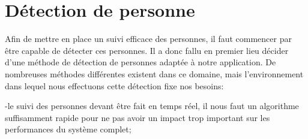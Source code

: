 \documentclass[11pt]{article}
\begin{document}

\section{Détection de personne}
Afin de mettre en place un suivi efficace des personnes, il faut commencer par être capable de détecter ces personnes. Il a donc fallu en premier lieu décider d'une méthode de détection de personnes adaptée à notre application. De nombreuses méthodes différentes existent dans ce domaine, mais l'environnement dans lequel nous effectuons cette détection fixe nos besoins:

-le suivi des personnes devant être fait en temps réel, il nous faut un algorithme suffisamment rapide pour ne pas avoir un impact trop important sur les performances du système complet;
\end{document}
